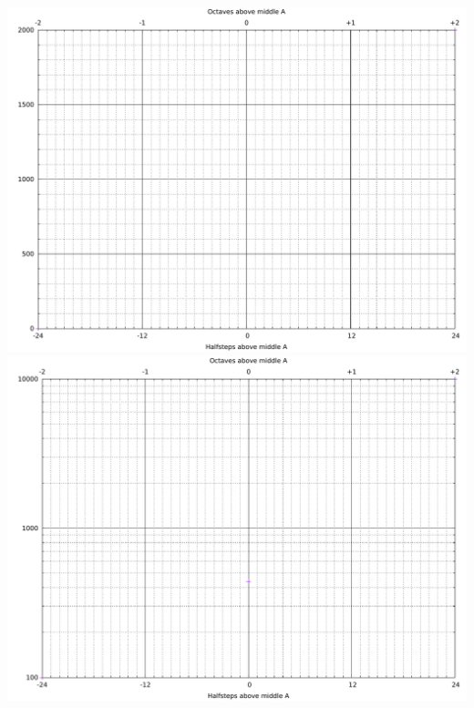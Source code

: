 \documentclass[10pt]{article}
\begin{document}
\begin{center}
  \includegraphics[height=0.49\textheight]{linpitch.pdf}\\
  \includegraphics[height=0.49\textheight]{logpitch.pdf}
\end{center}
\end{document}
